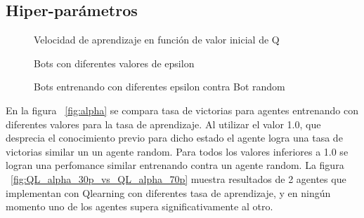 
\subsection{Hiper-parámetros}

\begin{figure}[H]
\begin{center}
\caption{Velocidad de aprendizaje en función de valor inicial de Q}
\label{fig:qinit}
\end{center}
\end{figure}



\begin{figure}[H]
\begin{center}
\caption{Bots con diferentes valores de epsilon}
\label{fig:epsilon}
\end{center}
\end{figure}


\begin{figure}[H]
\begin{center}
\caption{Bots entrenando con diferentes epsilon contra Bot random}
\label{fig:epsilon2}
\end{center}
\end{figure}

En la figura ~\ref{fig:alpha} se compara tasa de victorias para agentes entrenando con diferentes valores para la tasa de aprendizaje. Al utilizar el valor 1.0, que desprecia el conocimiento previo para dicho estado el agente logra una tasa de victorias similar un un agente random. Para todos los valores inferiores a 1.0 se logran una perfomance similar entrenando contra un agente random. La figura ~\ref{fig:QL_alpha_30p_vs_QL_alpha_70p} muestra resultados de 2 agentes que implementan con Qlearning con diferentes tasa de aprendizaje, y en ningún momento uno de los agentes supera significativamente al otro. 
 
\begin{figure}[H]
\begin{center}
\caption{}
\label{fig:alphag}
\end{center}
\end{figure}
